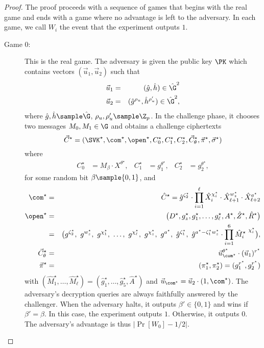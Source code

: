 
\begin{proof}
  The proof proceeds with a sequence of games that begins with the real game and ends with a game where no advantage is left to the adversary. In each game, we call $W_i$ the event that the experiment outputs $1$. 


  \begin{description}
  \item[\textsf{Game} $0$:] This is the real game. The adversary is given the public key $\PK$ which contains 
    vectors 
    $(\vec{u}_1, \vec{u}_2)$ such that
    \begin{eqnarray} \label{vec-PK} 
      \vec{u}_1 &=& (\hat{g}, \hat{h}) \in \hat{\G}^2  \\ \nonumber 
      \vec{u}_2 &=&  (\hat{g}^{\rho_u}, \hat{h}^{\rho_u'}) \in \hat{\G}^2,
    \end{eqnarray}
    where $\hat{g},\hat{h} \sample \hat{\G}$,  $\rho_u,\rho_u' \sample \Z_p$.
    In the challenge phase, 
    it chooses two messages $M_0,M_1 \in \G$ and obtains a challenge ciphertexts 
    $$  \vec{C}^\star = (\SVK^\star, \com^\star, \open^\star, C_0^\star, C_1^\star, C_2^\star, \vec{C}_{\theta}^\star, \vec{\pi}^\star, \vec{\sigma}^\star)  $$
    where 
    \begin{align*}
      C_0^\star &= M_{\beta} \cdot X^{\theta^\star}, & C_1^\star &= g_1^{\theta^\star}, & C_2^\star &= g_2^{\theta^\star},
    \end{align*}
    for some random bit $\beta \sample \{0,1\}$, and 
    \begin{eqnarray*}
      \com^\star  &=& \hat{C}^\star  = \hat{g}^{\zeta_2^\star} \cdot \prod_{i = 1}^{\ell }\hat{X}_i^{\chi_i^\star } \cdot \hat{X}_{\ell+1}^{w_z^\star} \cdot \hat{X}_{\ell+2}^{a^\star}  \\
      \open^\star &=& \big( D^\star , g_z^\star, g_1^\star, \dots, g_\ell^\star, A^\star  , \hat{Z}^\star, \hat{R}^\star \big)  \\ 
      & =& \big(  g^{\zeta_2^\star },~ g^{w_z^\star}, ~ g^{\chi_1^\star}, ~\ldots , ~ g^{\chi_\ell^\star} , ~ g^{\chi_z^\star} , ~ g^{a^\star}, ~ 		 
      \hat{g}^{\zeta_1^\star} ,  ~\hat{g}^{a^\star-\zeta_1^\star w_z^\star }  \cdot  \prod_{i=1}^{6} {\hat{M}_i^\star~ }^{\chi_i^\star} 
      \big), \\
      \vec{C}_{\theta}^\star &=& \vec{u}_{\com^\star}^{\theta^\star} \cdot (\vec{u}_1)^{r^\star}\\
      \vec{\pi}^\star &=& (\pi_1^\star,\pi_2^\star) =(g_1^{r^\star},g_2^{r^\star}) 
    \end{eqnarray*}
    with $(\hat{M}_1^\star,\ldots,\hat{M}_\ell^\star)=(\hat{g}_1^\star,\ldots,\hat{g}_5^\star,\hat{A}^\star) $ and 
    $\vec{u}_{\com^\star} = \vec{u}_2\cdot (1, \com^\star)$.
    \indent The adversary's decryption queries are always faithfully answered by the challenger. When the adversary halts, it outputs   
    $\beta' \in \{0,1\}$ and wins if $\beta' =\beta$. In this case, the experiment outputs $1$. Otherwise, it outputs $0$.  
    The adversary's advantage is thus $|\Pr[W_0]-1/2|$. \smallskip \smallskip 


\end{description}
\end{proof}
